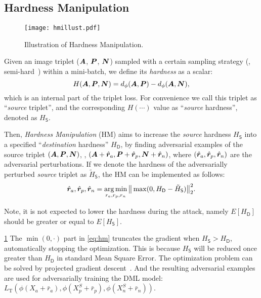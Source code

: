 \documentclass[10pt,twocolumn,letterpaper]{article}
\begin{document}
\subsection{Hardness Manipulation}
\label{sec:31}

\begin{figure}
	\texttt{[image: hmillust.pdf]}
	\caption{Illustration of Hardness Manipulation.}
	\label{fig:hm}
\end{figure}


Given an image triplet (${\bm{A}}$, ${\bm{P}}$, ${\bm{N}}$) sampled with a certain sampling
strategy (\eg, semi-hard~\cite{facenet}) within a mini-batch, we define its
\emph{hardness} as a scalar:
%
\begin{equation}
%
H(\mA,\mP,\mN)=d_\phi(\mA,\mP)-d_\phi(\mA,\mN),
%
\end{equation}
%
which is an internal part of the triplet loss.
%
For convenience we call this triplet as ``\emph{source} triplet'', and the
corresponding $H(\cdots)$ value as ``\emph{source} hardness'', denoted as
$H_\mathsf{S}$.


Then, \emph{Hardness Manipulation} (HM) aims to increase the \emph{source} hardness
$H_\mathsf{S}$ into a specified ``\emph{destination} hardness'' $H_\mathsf{D}$,
by finding adversarial examples of the source triplet $({\bm{A}}, {\bm{P}}, {\bm{N}})$, \ie,
$({\bm{A}} + \hat{{\bm{r}}}_a, {\bm{P}} + \hat{{\bm{r}}}_p, {\bm{N}} + \hat{{\bm{r}}}_n)$,
where $(\hat{{\bm{r}}}_a, \hat{{\bm{r}}}_p, \hat{{\bm{r}}}_n)$ are the adversarial perturbations.
%
If we denote the hardness of the adversarially perturbed \emph{source} triplet
as $\tilde{H}_\mathsf{S}$, the HM can be implemented as follows:
%
\begin{equation}
	\hat{{\bm{r}}}_a, \hat{{\bm{r}}}_p, \hat{{\bm{r}}}_n = \operatorname*{arg\,min}_{r_a,r_p,r_n} \big\|\max(0,
	H_\mathsf{D} - \tilde{H}_\mathsf{S} ) \big\|_2^2.
	\label{eq:hm}
\end{equation}

%
Note, it is not expected to lower the hardness during the attack, namely
$E[H_\mathsf{D}]$ should be greater or equal to $E[H_\mathsf{S}]$.
%
%

\cref{fig:hm}
%
The $\min(0,\cdot)$ part in \cref{eq:hm} truncates the gradient when $H_\mathsf{S}>H_\mathsf{D}$,
automatically stopping the optimization.
%
This is because $H_\mathsf{S}$ will be reduced once greater than $H_\mathsf{D}$ in standard Mean
Square Error.
%
The optimization problem can be solved by projected gradient
descent~\cite{madry}.
%
And the resulting adversarial examples are used for adversarially training the
DML model:
%
$L_\text{T}(\phi(X_a+\bar{r}_a), \phi(X_p^S+\bar{r}_p),
\phi(X_n^S+\bar{r}_n))$.
\end{document}
